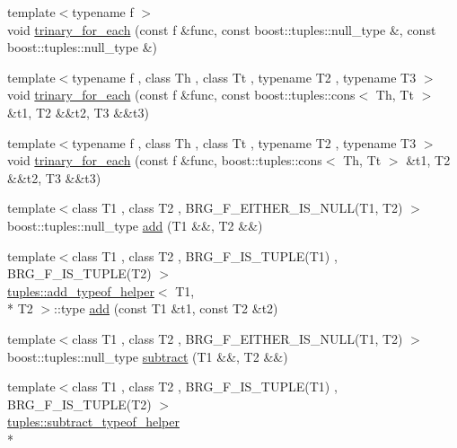 \begin{DoxyCompactItemize}
\item 
{\footnotesize template$<$typename f $>$ }\\void \hyperlink{namespaceIceBRG_a6a88a4930e8c382bce5d55d4630c131f}{trinary\-\_\-for\-\_\-each} (const f \&func, const boost\-::tuples\-::null\-\_\-type \&, const boost\-::tuples\-::null\-\_\-type \&)
\item 
{\footnotesize template$<$typename f , class Th , class Tt , typename T2 , typename T3 $>$ }\\void \hyperlink{namespaceIceBRG_ab9fe1517fcdfa97efaf8d8ce9923855b}{trinary\-\_\-for\-\_\-each} (const f \&func, const boost\-::tuples\-::cons$<$ Th, Tt $>$ \&t1, T2 \&\&t2, T3 \&\&t3)
\item 
{\footnotesize template$<$typename f , class Th , class Tt , typename T2 , typename T3 $>$ }\\void \hyperlink{namespaceIceBRG_a79ab6db846823a5ab49f0f530d605512}{trinary\-\_\-for\-\_\-each} (const f \&func, boost\-::tuples\-::cons$<$ Th, Tt $>$ \&t1, T2 \&\&t2, T3 \&\&t3)
\item 
{\footnotesize template$<$class T1 , class T2 , B\-R\-G\-\_\-\-F\-\_\-\-E\-I\-T\-H\-E\-R\-\_\-\-I\-S\-\_\-\-N\-U\-L\-L(\-T1, T2) $>$ }\\boost\-::tuples\-::null\-\_\-type \hyperlink{namespaceIceBRG_a3b6257f50ca02b4f31a39ec81ab1b38d}{add} (T1 \&\&, T2 \&\&)
\item 
{\footnotesize template$<$class T1 , class T2 , B\-R\-G\-\_\-\-F\-\_\-\-I\-S\-\_\-\-T\-U\-P\-L\-E(\-T1) , B\-R\-G\-\_\-\-F\-\_\-\-I\-S\-\_\-\-T\-U\-P\-L\-E(\-T2) $>$ }\\\hyperlink{namespaceIceBRG_1_1tuples_structIceBRG_1_1tuples_1_1add__typeof__helper}{tuples\-::add\-\_\-typeof\-\_\-helper}$<$ T1, \\*
T2 $>$\-::type \hyperlink{namespaceIceBRG_a073df9445861d65d982a2defc81f3291}{add} (const T1 \&t1, const T2 \&t2)
\item 
{\footnotesize template$<$class T1 , class T2 , B\-R\-G\-\_\-\-F\-\_\-\-E\-I\-T\-H\-E\-R\-\_\-\-I\-S\-\_\-\-N\-U\-L\-L(\-T1, T2) $>$ }\\boost\-::tuples\-::null\-\_\-type \hyperlink{namespaceIceBRG_ae47ad1ad601f3c2f4e6b20fbe3e7006f}{subtract} (T1 \&\&, T2 \&\&)
\item 
{\footnotesize template$<$class T1 , class T2 , B\-R\-G\-\_\-\-F\-\_\-\-I\-S\-\_\-\-T\-U\-P\-L\-E(\-T1) , B\-R\-G\-\_\-\-F\-\_\-\-I\-S\-\_\-\-T\-U\-P\-L\-E(\-T2) $>$ }\\\hyperlink{namespaceIceBRG_1_1tuples_structIceBRG_1_1tuples_1_1subtract__typeof__helper}{tuples\-::subtract\-\_\-typeof\-\_\-helper}\\*

\end{DoxyCompactItemize}
